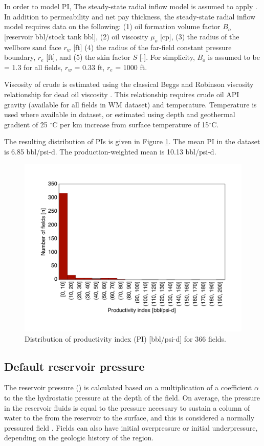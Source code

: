 \documentclass[11pt]{report}
\newcommand{\xlname}[1]{\raisebox{1pt}{\fcolorbox{light-gray}{light-gray}{\texttt{\textcolor{stanford}{\scriptsize{#1}}}}}}
\begin{document}
In order to model PI, The steady-state radial inflow model is assumed to apply \cite[Ch. 3]{Guo2019}. In addition to permeability and net pay thickness, the steady-state radial inflow model requires data on the following: (1) oil formation volume factor $B_o$ [reservoir bbl/stock tank bbl], (2) oil viscosity $\mu_o$ [cp], (3) the radius of the wellbore sand face  $r_w$ [ft] (4) the radius of the far-field constant pressure boundary, $r_e$ [ft], and (5) the skin factor $S$ [-]. For simplicity, $B_o$ is assumed to be = 1.3 for all fields, $r_w$ = 0.33 ft, $r_e$ = 1000 ft. 

Viscosity of crude is estimated using the classical Beggs and Robinson viscosity relationship for dead oil viscosity \cite{PengTools2021}. This relationship requires crude oil API gravity (available for all fields in WM dataset) and temperature. Temperature is used where available in dataset, or estimated using depth and geothermal gradient of 25 $^\circ$C per km increase from surface temperature of 15$^\circ$C.

The resulting distribution of PIs is given in Figure \ref{fig:PIdist}. The mean PI in the dataset is 6.85 bbl/psi-d. The production-weighted mean is 10.13 bbl/psi-d.


\begin{figure}
\includegraphics[width=0.8\columnwidth]{images/ProdIndexDist.pdf}
\caption{Distribution of productivity index (PI) [bbl/psi-d] for 366 fields.}
\label{fig:PIdist}
\end{figure}



\subsection{Default reservoir pressure}
The reservoir pressure (\xlname{Res\_press}) is calculated based on a multiplication of a coefficient $\alpha$ to the the hydrostatic pressure at the depth of the field. On average, the pressure in the reservoir fluids is equal to the pressure necessary to sustain a column of water to the from the reservoir to the surface, and this is considered a normally pressured field \cite{fertl1981abnormal}. Fields can also have initial overpressure or initial underpressure, depending on the geologic history of the region.
\end{document}
